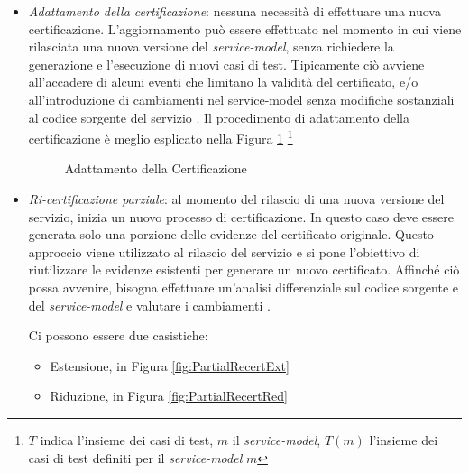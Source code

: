 \documentclass[../main.tex]{subfiles}
\begin{document}
\begin{itemize}
\item \textit{Adattamento della certificazione}: nessuna necessità di effettuare una nuova certificazione. L'aggiornamento può essere effettuato nel momento in cui viene rilasciata una nuova versione del \textit{service-model}, senza richiedere la generazione e l'esecuzione di nuovi casi di test.
Tipicamente ciò avviene all'accadere di alcuni eventi che limitano la validità del certificato, e/o all'introduzione di cambiamenti nel service-model senza modifiche sostanziali al codice sorgente del servizio \cite{CertEvolutiva}.
Il procedimento di adattamento della certificazione è meglio esplicato nella Figura \ref{fig:AdattamCert} \footnote{$T$ indica l'insieme dei casi di test, $m$ il \textit{service-model}, $T(m)$ l'insieme dei casi di test definiti per il \textit{service-model} $m$}

\begin{figure}[H]
\centering
{}
\caption{Adattamento della Certificazione \cite{CertEvolutiva}}\label{fig:AdattamCert}
\end{figure}


\item \textit{Ri-certificazione parziale}: al momento del rilascio di una nuova versione del servizio, inizia un nuovo processo di certificazione. In questo caso deve essere generata solo una porzione delle evidenze del certificato originale.
Questo approccio viene utilizzato al rilascio del servizio e si pone l'obiettivo di riutilizzare le evidenze esistenti per generare un nuovo certificato. Affinché ciò possa avvenire, bisogna effettuare un'analisi differenziale sul codice sorgente e del \textit{service-model} e valutare i cambiamenti \cite{CertEvolutiva}.

Ci possono essere due casistiche:
\begin{itemize}
\item Estensione, in Figura \ref{fig:PartialRecertExt}
\item Riduzione, in Figura \ref{fig:PartialRecertRed}
\end{itemize}


\end{itemize}
\end{document}

